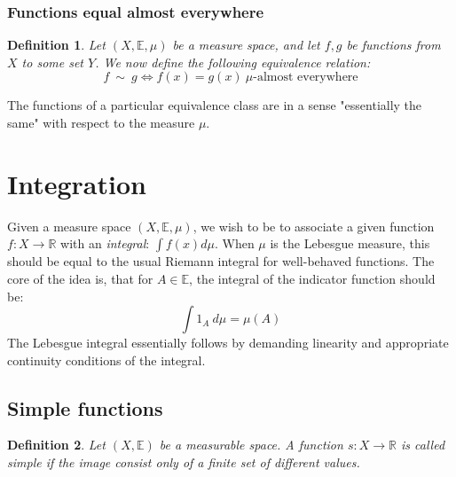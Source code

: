 \documentclass[12pt, a4paper]{article}
\newtheorem{definition}{Definition}[section]
\numberwithin{equation}{section}
\begin{document}
\subsubsection{Functions equal almost everywhere}
\begin{definition}
Let $(X,\mathbb{E},\mu)$ be a measure space, and let $f, g$ be functions from $X$ to some set $Y$. We now define the following equivalence relation:
\begin{equation}
f\ \sim\ g \Leftrightarrow f(x)=g(x)\ \mu\textrm{-almost everywhere}
\end{equation}
\end{definition}

The functions of a particular equivalence class are in a sense "essentially the same" with respect to the measure $\mu$.

\section{Integration}
Given a measure space $(X,\mathbb{E},\mu)$, we wish to be to associate a given function $f: X\rightarrow\mathbb{R}$ with an \textit{integral}: $\int f(x)d\mu$. When $\mu$ is the Lebesgue measure, this should be equal to the usual Riemann integral for well-behaved functions. The core of the idea is, that for $A\in\mathbb{E}$, the integral of the indicator function should be:
\begin{equation}
\label{indicator_integral}
\int 1_A\ d\mu = \mu(A)
\end{equation}
The Lebesgue integral essentially follows by demanding linearity and appropriate continuity conditions of the integral.

\subsection{Simple functions}
\begin{definition}
Let $(X,\mathbb{E})$ be a measurable space. A function $s: X\rightarrow\mathbb{R}$ is called simple if the image consist only of a finite set of different values. 
\end{definition}
\end{document}
